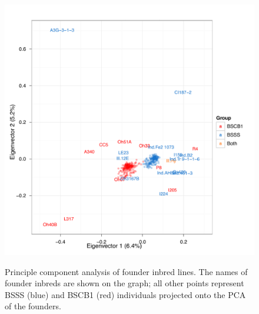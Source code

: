 \renewcommand{\thefigure}{S\arabic{figure}}
\renewcommand{\thetable}{S\arabic{table}}

\begin{figure}   
  \begin{center}
   \vspace{-0mm}
   \includegraphics[width=0.7\linewidth]{pca_founders}
   \vspace{-3mm}
   \caption{ Principle component analysis of founder inbred lines. The names of founder inbreds are shown on the graph; all other points represent BSSS (blue) and BSCB1 (red) individuals projected onto the PCA of the founders.
} 
\vspace{-6mm}
    \label{fig:sfounders}
  \end{center}
\end{figure}


